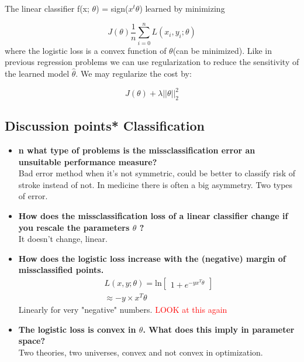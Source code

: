 The linear classifier f(x; $\theta$) = sign($x^{t}\theta$) learned by minimizing

\begin{equation}
J(\theta) \frac{1} {n} \sum_{i=0}^{n} L(x_i,y_i;\theta)
\end{equation}
where the logistic loss is a convex function of $\theta $(can be minimized). Like in previous regression problems we can use regularization to reduce the sensitivity of the learned model $\hat{\theta}$. We may regularize the cost by:

\begin{equation}
 J(\theta) + \lambda || \theta ||^2_2
 \end{equation} 


\subsection*{Discussion points* Classification}

\begin{itemize}
	\item \textbf{n what type of problems is the missclassification error an
unsuitable performance measure?} \\
Bad error method when it's not symmetric, could be better to classify risk of stroke instead of not. In medicine there is often a big asymmetry. Two types of error. 


	\item \textbf{How does the missclassification loss of a linear classifier
change if you rescale the parameters $\theta$ ?}\\
It doesn't change, linear.


	\item \textbf{How does the logistic loss increase with the (negative) margin
of missclassified points.}\\
\begin{equation}
\begin{aligned}
L(x,y;\theta) = \text{ln}\begin{bmatrix} 1+ e^{-yx^{T}\theta} \end{bmatrix}
\\ \approx -y\times x^{T}\theta
\end{aligned}
\end{equation}
Linearly for very "negative" numbers.  
\textcolor{red}{LOOK at this again} 


	\item \textbf{The logistic loss is convex in $\theta$. What does this imply in
parameter space?}\\
Two theories, two universes, convex and not convex in optimization. 




\end{itemize}

